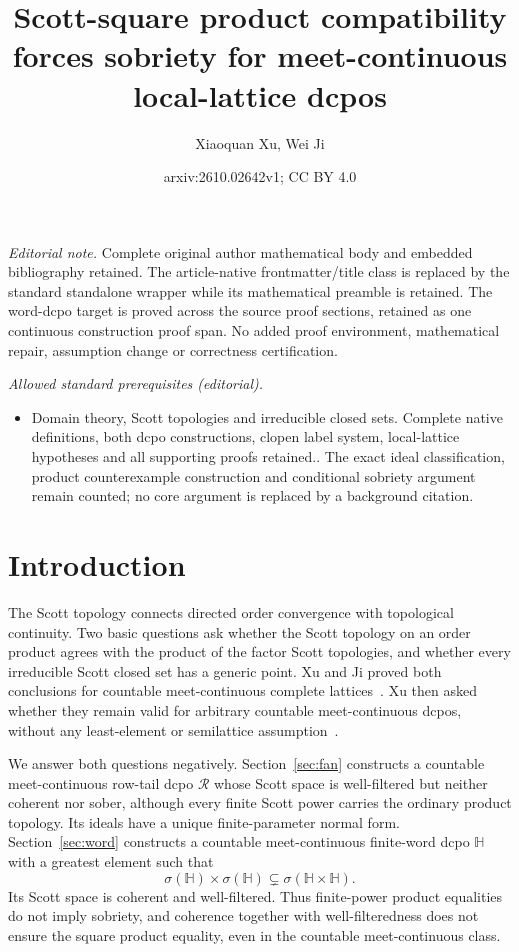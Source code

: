 \documentclass[10pt,a4paper]{article}
\title{Scott-square product compatibility forces sobriety for meet-continuous local-lattice dcpos}
\author{Xiaoquan Xu, Wei Ji}
\date{arxiv:2610.02642v1; CC BY 4.0}
\theoremstyle{definition}
\newcommand{\HH}{\mathbb H}
\newcommand{\RR}{\mathcal R}
\begin{document}
\maketitle
\noindent\textit{Editorial note.} Complete original author mathematical body and embedded bibliography retained. The article-native frontmatter/title class is replaced by the standard standalone wrapper while its mathematical preamble is retained. The word-dcpo target is proved across the source proof sections, retained as one continuous construction proof span. No added proof environment, mathematical repair, assumption change or correctness certification.\par\medskip
\noindent\textit{Allowed standard prerequisites (editorial).}\begin{itemize}
\item Domain theory, Scott topologies and irreducible closed sets. Complete native definitions, both dcpo constructions, clopen label system, local-lattice hypotheses and all supporting proofs retained.. The exact ideal classification, product counterexample construction and conditional sobriety argument remain counted; no core argument is replaced by a background citation.
\end{itemize}\medskip
\section{Introduction}\label{sec:intro}
The Scott topology connects directed order convergence with topological continuity. Two basic questions ask whether the Scott topology on an order product agrees with the product of the factor Scott topologies, and whether every irreducible Scott closed set has a generic point. Xu and Ji proved both conclusions for countable meet-continuous complete lattices~\cite[Theorem~1.1]{XuJi}. Xu then asked whether they remain valid for arbitrary countable meet-continuous dcpos, without any least-element or semilattice assumption~\cite[Questions~1.1 and~1.2]{Xu}.

We answer both questions negatively. Section~\ref{sec:fan} constructs a countable meet-continuous row-tail dcpo $\RR$ whose Scott space is well-filtered but neither coherent nor sober, although every finite Scott power carries the ordinary product topology. Its ideals have a unique finite-parameter normal form. Section~\ref{sec:word} constructs a countable meet-continuous finite-word dcpo $\HH$ with a greatest element such that
\[
 \sigma(\HH)\times\sigma(\HH)\subsetneq\sigma(\HH\times\HH).
\]
Its Scott space is coherent and well-filtered. Thus finite-power product equalities do not imply sobriety, and coherence together with well-filteredness does not ensure the square product equality, even in the countable meet-continuous class.
\end{document}
